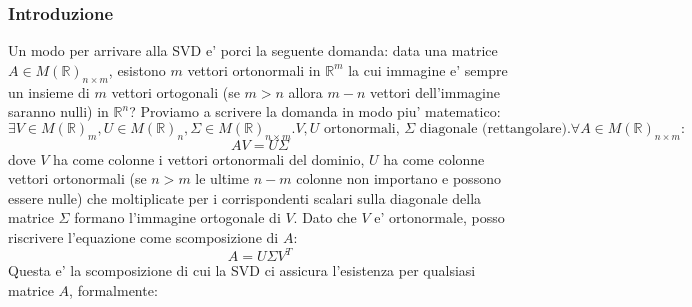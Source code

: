 \subsubsection{Introduzione}
Un modo per arrivare alla SVD e' porci la seguente domanda: data una matrice $ A \in M(\mathbb{R})_{n \times m} $, esistono $ m $ vettori ortonormali in $ \mathbb{R}^m $ la cui immagine e' sempre un insieme di $ m $ vettori ortogonali (se $ m > n $ allora $ m -n $ vettori dell'immagine saranno nulli) in $ \mathbb{R}^n $? Proviamo a scrivere la domanda in modo piu' matematico:
\[
  \exists V \in M(\mathbb{R})_{m}, U \in M(\mathbb{R})_n, \Sigma \in M(\mathbb{R})_{n \times m}. V, U \text{ ortonormali, } \Sigma \text{ diagonale (rettangolare)}. \forall A \in M(\mathbb{R})_{n \times m}:
\]
\[
 AV = U\Sigma
\]
dove $ V $ ha come colonne i vettori ortonormali del dominio, $ U $ ha come colonne vettori ortonormali (se $ n > m $ le ultime $ n-m $ colonne non importano e possono essere nulle) che moltiplicate per i corrispondenti scalari sulla diagonale della matrice $ \Sigma $ formano l'immagine ortogonale di $ V $. Dato che $ V $ e' ortonormale, posso riscrivere l'equazione come scomposizione di $ A $:
\[
A = U\Sigma V^T
\]
Questa e' la scomposizione di cui la SVD ci assicura l'esistenza per qualsiasi matrice $ A $, formalmente:

